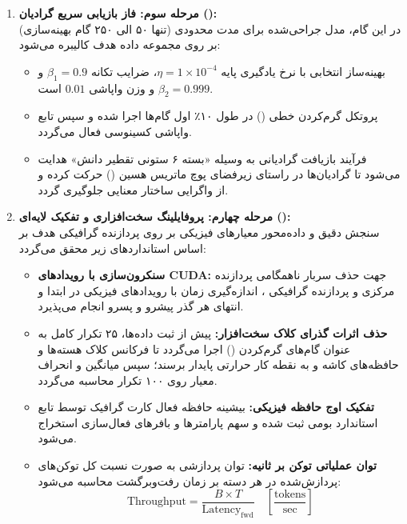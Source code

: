 \documentclass[12pt,a4paper]{report}
\theoremstyle{definition}
\begin{document}
\begin{enumerate}
    \item \textbf{مرحله سوم: فاز بازیابی سریع گرادیان ():} \\
    در این گام، مدل جراحی‌شده برای مدت محدودی (تنها ۵۰ الی ۲۵۰ گام بهینه‌سازی) بر روی مجموعه داده هدف کالیبره می‌شود:
    \begin{itemize}
        \item بهینه‌ساز انتخابی  با نرخ یادگیری پایه $\eta = 1 \times 10^{-4}$، ضرایب تکانه $\beta_1=0.9$ و $\beta_2=0.999$ و وزن واپاشی $0.01$ است.
        \item پروتکل گرم‌کردن خطی () در طول ۱۰٪ اول گام‌ها اجرا شده و سپس تابع واپاشی کسینوسی فعال می‌گردد.
        \item فرآیند بازیافت گرادیانی به وسیله «بسته ۶ ستونی تقطیر دانش» هدایت می‌شود تا گرادیان‌ها در راستای زیرفضای پوچ ماتریس هسین () حرکت کرده و از واگرایی ساختار معنایی جلوگیری گردد.
    \end{itemize}

    \item \textbf{مرحله چهارم: پروفایلینگ سخت‌افزاری و تفکیک لایه‌ای ():} \\
    سنجش دقیق و داده‌محور معیارهای فیزیکی بر روی پردازنده گرافیکی هدف بر اساس استانداردهای زیر محقق می‌گردد:
    \begin{itemize}
        \item \textbf{سنکرون‌سازی با رویدادهای CUDA:} جهت حذف سربار ناهمگامی پردازنده مرکزی  و پردازنده گرافیکی ، اندازه‌گیری زمان با رویدادهای فیزیکی  در ابتدا و انتهای هر گذر پیشرو و پسرو انجام می‌پذیرد.
        \item \textbf{حذف اثرات گذرای کلاک سخت‌افزار:} پیش از ثبت داده‌ها، ۲۵ تکرار کامل به عنوان گام‌های گرم‌کردن () اجرا می‌گردد تا فرکانس کلاک هسته‌ها و حافظه‌های کاشه  و  به نقطه کار حرارتی پایدار برسند؛ سپس میانگین و انحراف معیار روی ۱۰۰ تکرار محاسبه می‌گردد.
        \item \textbf{تفکیک اوج حافظه فیزیکی:} بیشینه حافظه فعال کارت گرافیک توسط تابع استاندارد بومی  ثبت شده و سهم پارامترها و بافرهای فعال‌سازی استخراج می‌شود.
        \item \textbf{توان عملیاتی توکن بر ثانیه:} توان پردازشی به صورت نسبت کل توکن‌های پردازش‌شده در هر دسته بر زمان رفت‌وبرگشت محاسبه می‌شود:
        \begin{equation}
            \text{Throughput} = \frac{B \times T}{\text{Latency}_{\text{fwd}}} \quad \left[\frac{\text{tokens}}{\text{sec}}\right]
        \end{equation}
    \end{itemize}
\end{enumerate}
\end{document}
